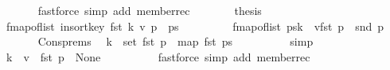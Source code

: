 \begin{isabellebody}
\ \ \ \ \ \ \isamarkupfalse%
\ {\isacharparenleft}{\kern0pt}fastforce\ simp\ add{\isacharcolon}{\kern0pt}\ member{\isacharunderscore}{\kern0pt}rec{\isacharparenleft}{\kern0pt}{}{\isacharparenright}{\kern0pt}{\isacharparenright}{\kern0pt}\isanewline
\ \ \ \ \isamarkupfalse%
\ \isamarkupfalse%
\ {\isacharquery}{\kern0pt}thesis\isanewline
\ \ \ \ \isamarkupfalse%
\ {\isacharminus}{\kern0pt}\isanewline
\ \ \ \ \ \ \isamarkupfalse%
\ {\isacharasterisk}{\kern0pt}{\isacharcolon}{\kern0pt}\ {\isachardoublequoteopen}fmap{\isacharunderscore}{\kern0pt}of{\isacharunderscore}{\kern0pt}list\ {\isacharparenleft}{\kern0pt}insort{\isacharunderscore}{\kern0pt}key\ fst\ {\isacharparenleft}{\kern0pt}k{\isacharcomma}{\kern0pt}\ v{\isacharparenright}{\kern0pt}\ {\isacharparenleft}{\kern0pt}p\ {\isacharhash}{\kern0pt}\ ps{\isacharparenright}{\kern0pt}{\isacharparenright}{\kern0pt}\ {\isacharequal}{\kern0pt}\isanewline
\ \ \ \ \ \ \ \ {\isacharparenleft}{\kern0pt}fmap{\isacharunderscore}{\kern0pt}of{\isacharunderscore}{\kern0pt}list\ ps{\isacharparenright}{\kern0pt}{\isacharparenleft}{\kern0pt}k\ {\isachardollar}{\kern0pt}{\isachardollar}{\kern0pt}{\isacharcolon}{\kern0pt}{\isacharequal}{\kern0pt}\ v{\isacharparenright}{\kern0pt}{\isacharparenleft}{\kern0pt}fst\ p\ {\isachardollar}{\kern0pt}{\isachardollar}{\kern0pt}{\isacharcolon}{\kern0pt}{\isacharequal}{\kern0pt}\ snd\ p{\isacharparenright}{\kern0pt}{\isachardoublequoteclose}\isanewline
\ \ \ \ \ \ \isamarkupfalse%
\ Cons{\isachardot}{\kern0pt}prems{\isacharparenleft}{\kern0pt}{}{\isacharparenright}{\kern0pt}\ \isamarkupfalse%
\ {\isachardoublequoteopen}k\ {\isasymnotin}\ set\ {\isacharparenleft}{\kern0pt}fst\ p\ {\isacharhash}{\kern0pt}\ map\ fst\ ps{\isacharparenright}{\kern0pt}{\isachardoublequoteclose}\isanewline
\ \ \ \ \ \ \ \ \isamarkupfalse%
\ simp\isanewline
\ \ \ \ \ \ \isamarkupfalse%
\ \isamarkupfalse%
\ {\isacharasterisk}{\kern0pt}{\isacharasterisk}{\kern0pt}{\isacharcolon}{\kern0pt}\ {\isachardoublequoteopen}{\isacharbraceleft}{\kern0pt}k\ {\isachardollar}{\kern0pt}{\isachardollar}{\kern0pt}{\isacharcolon}{\kern0pt}{\isacharequal}{\kern0pt}\ v{\isacharbraceright}{\kern0pt}\ {\isachardollar}{\kern0pt}{\isachardollar}{\kern0pt}\ {\isacharparenleft}{\kern0pt}fst\ p{\isacharparenright}{\kern0pt}\ {\isacharequal}{\kern0pt}\ None{\isachardoublequoteclose}\isanewline
\ \ \ \ \ \ \ \ \isamarkupfalse%
\ {\isacharparenleft}{\kern0pt}fastforce\ simp\ add{\isacharcolon}{\kern0pt}\ member{\isacharunderscore}{\kern0pt}rec{\isacharparenleft}{\kern0pt}{}{\isacharparenright}{\kern0pt}{\isacharparenright}{\kern0pt}\isanewline

\end{isabellebody}

